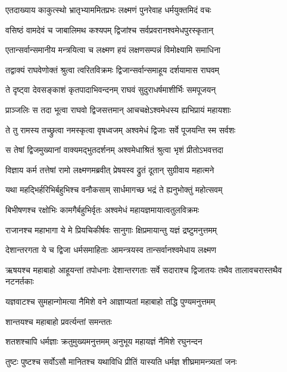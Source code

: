 
\twolineshloka
{एतदाख्याय काकुत्स्थो भ्रातृभ्याममितप्रभः}
{लक्ष्मणं पुनरेवाह धर्मयुक्तमिदं वचः} %

\twolineshloka
{वसिष्ठं वामदेवं च जाबालिमथ कश्यपम्}
{द्विजांश्च सर्वप्रवरानश्वमेधपुरस्कृतान्} %

\twolineshloka
{एतान्सर्वान्समानीय मन्त्रयित्वा च लक्ष्मण}
{हयं लक्षणसम्पन्नं विमोक्ष्यामि समाधिना} %

\twolineshloka
{तद्वाक्यं राघवेणोक्तं श्रुत्वा त्वरितविक्रमः}
{द्विजान्सर्वान्समाहूय दर्शयामास राघवम्} %

\twolineshloka
{ते दृष्ट्वा देवसङ्काशं कृतपादाभिवन्दनम्}
{राघवं सुदुराधर्षमाशीर्भिः समपूजयन्} %

\twolineshloka
{प्राञ्जलिः स तदा भूत्वा राघवो द्विजसत्तमान्}
{आचचक्षेऽश्वमेधस्य ह्यभिप्रायं महायशाः} %

\twolineshloka
{ते तु रामस्य तच्छ्रुत्वा नमस्कृत्वा वृषध्वजम्}
{अश्वमेधं द्विजाः सर्वे पूजयन्ति स्म सर्वशः} %

\twolineshloka
{स तेषां द्विजमुख्यानां वाक्यमद्भुतदर्शनम्}
{अश्वमेधाश्रितं श्रुत्वा भृशं प्रीतोऽभवत्तदा} %

\twolineshloka
{विज्ञाय कर्म तत्तेषां रामो लक्ष्मणमब्रवीत्}
{प्रेषयस्व द्रुतं दूतान् सुग्रीवाय महात्मने} %

\twolineshloka
{यथा महद्भिर्हरिभिर्बहुभिश्च वनौकसाम्}
{सार्धमागच्छ भद्रं ते ह्यनुभोक्तुं महोत्सवम्} %

\twolineshloka
{बिभीषणश्च रक्षोभिः कामगैर्बहुभिर्वृतः}
{अश्वमेधं महायज्ञमायात्वतुलविक्रमः} %

\twolineshloka
{राजानश्च महाभागा ये मे प्रियचिकीर्षवः}
{सानुगाः क्षिप्रमायान्तु यज्ञं द्रष्टुमनुत्तमम्} %

\twolineshloka
{देशान्तरगता ये च द्विजा धर्मसमाहिताः}
{आमन्त्रयस्व तान्सर्वानश्वमेधाय लक्ष्मण} %

\threelineshloka
{ऋषयश्च महाबाहो आहूयन्तां तपोधनाः}
{देशान्तरगताः सर्वे सदाराश्च द्विजातयः}
{तथैव तालावचरास्तथैव नटनर्तकाः} %

\twolineshloka
{यज्ञवाटश्च सुमहान्गोमत्या नैमिशे वने}
{आज्ञाप्यतां महाबाहो तद्धि पुण्यमनुत्तमम्} %

\onelineshloka
{शान्तयश्च महाबाहो प्रवर्त्यन्तां समन्ततः} %

\twolineshloka
{शतशश्चापि धर्मज्ञाः क्रतुमुख्यमनुत्तमम्}
{अनुभूय महायज्ञं नैमिशे रघुनन्दन} %

\twolineshloka
{तुष्टः पुष्टश्च सर्वोऽसौ मानितश्च यथाविधि}
{प्रीतिं यास्यति धर्मज्ञ शीघ्रमामन्त्र्यतां जनः} %

